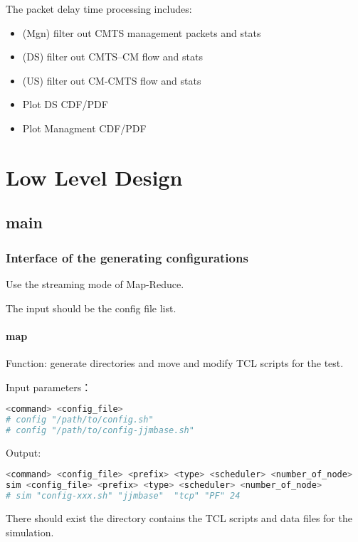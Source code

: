 The packet delay time processing includes:
\begin{itemize}
  \item (Mgn) filter out CMTS management packets and stats
  \item (DS) filter out CMTS--CM flow and stats
  \item (US) filter out CM-CMTS flow and stats
  \item Plot DS CDF/PDF
  \item Plot Managment CDF/PDF
\end{itemize}


\chapter{Low Level Design}

\section{main}


\subsection{Interface of the generating configurations}

Use the streaming mode of Map-Reduce.

The input should be the config file list.


\subsubsection{map}
Function: generate directories and move and modify TCL scripts for the test.


Input parameters：
\begin{lstlisting}[language=bash]
<command> <config_file>
# config "/path/to/config.sh"
# config "/path/to/config-jjmbase.sh"
\end{lstlisting}


Output:
\begin{lstlisting}[language=bash]
<command> <config_file> <prefix> <type> <scheduler> <number_of_node>
sim <config_file> <prefix> <type> <scheduler> <number_of_node>
# sim "config-xxx.sh" "jjmbase"  "tcp" "PF" 24
\end{lstlisting}

There should exist the directory contains the TCL scripts and data files for the simulation.





